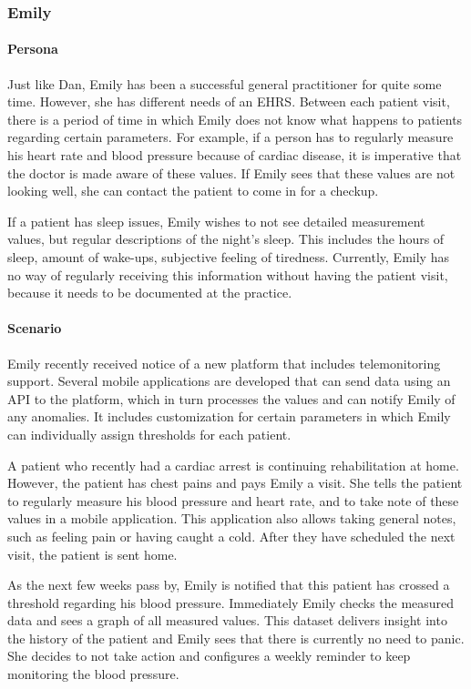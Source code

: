        \subsubsection{Emily}

        \paragraph{Persona} Just like Dan, Emily has been a successful general practitioner for quite some time. However, she has different needs of an EHRS. Between each patient visit, there is a period of time in which Emily does not know what happens to patients regarding certain parameters. For example, if a person has to regularly measure his heart rate and blood pressure because of cardiac disease, it is imperative that the doctor is made aware of these values. If Emily sees that these values are not looking well, she can contact the patient to come in for a checkup.

        If a patient has sleep issues, Emily wishes to not see detailed measurement values, but regular descriptions of the night’s sleep. This includes the hours of sleep, amount of wake-ups, subjective feeling of tiredness. Currently, Emily has no way of regularly receiving this information without having the patient visit, because it needs to be documented at the practice.
        
        \paragraph{Scenario} Emily recently received notice of a new platform that includes telemonitoring support. Several mobile applications are developed that can send data using an API to the platform, which in turn processes the values and can notify Emily of any anomalies. It includes customization for certain parameters in which Emily can individually assign thresholds for each patient.

        A patient who recently had a cardiac arrest is continuing rehabilitation at home. However, the patient has chest pains and pays Emily a visit. She tells the patient to regularly measure his blood pressure and heart rate, and to take note of these values in a mobile application. This application also allows taking general notes, such as feeling pain or having caught a cold. After they have scheduled the next visit, the patient is sent home.
        
        As the next few weeks pass by, Emily is notified that this patient has crossed a threshold regarding his blood pressure. Immediately Emily checks the measured data and sees a graph of all measured values. This dataset delivers insight into the history of the patient and Emily sees that there is currently no need to panic. She decides to not take action and configures a weekly reminder to keep monitoring the blood pressure.
        
